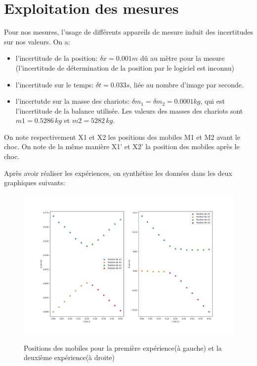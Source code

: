 \documentclass[12pt]{article}
\begin{document}
\section{Exploitation des mesures}
Pour nos mesures, l'usage de différents appareils de mesure induit des incertitudes sur nos valeurs. On a:
\begin{itemize}
    \item l'incertitude de la position: $\delta x = 0.001m$ dû au mètre pour la mesure (l'incertitude de détermination de la position par le logiciel est inconnu)
    \item l'incertitude sur le temps: $\delta t = 0.033s$, liée au nombre d'image par seconde. 
    \item l'incertutde sur la masse des chariots: $\delta m_1 =\delta m_2 = 0.0001 kg$, qui est l'incertitude de la balance utilisée. Les valeurs des masses des chariots sont $m1=0.5286\,kg$ et $m2=5282\, kg$.
\end{itemize}

On note respectivement X1 et X2 les positions des mobiles M1 et M2 avant le choc. On note de la même manière X1' et X2' la position des mobiles après le choc. 

\newpage
Après avoir réaliser les expériences, on synthétise les données dans les deux graphiques suivants:
\begin{figure}[h!]
	\begin{center}
		\includegraphics[scale=0.5]{GrapheX.png}
		\label{GrapheX1,...}
		 \caption{Positions des mobiles pour la première expérience(à gauche) et la deuxième expérience(à droite)}
	\end{center}
\end{figure}
\end{document}
